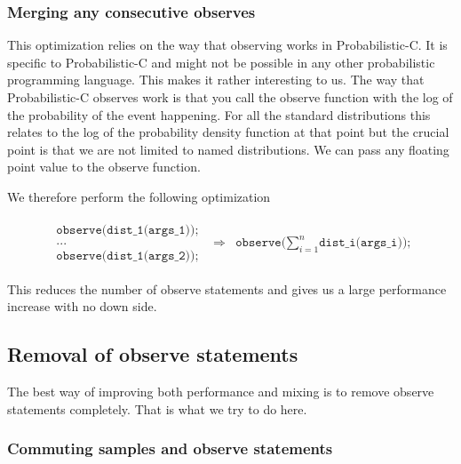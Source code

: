 \documentclass[a4paper]{article}
\newcommand{\optimization}[2]{
	\[
		\begin{array}{rcl}
			#1 & \Rightarrow & #2
		\end{array}
	\]
}
\begin{document}
\subsubsection{Merging any consecutive observes}

This optimization relies on the way that observing works in Probabilistic-C. It is specific to Probabilistic-C and might not be possible in any other probabilistic programming language. This makes it rather interesting to us. The way that Probabilistic-C observes work is that you call the observe function with the log of the probability of the event happening. For all the standard distributions this relates to the log of the probability density function at that point but the crucial point is that we are not limited to named distributions. We can pass any floating point value to the observe function.

We therefore perform the following optimization
\optimization{
	\begin{array}{l}
		\texttt{observe(dist\_1(args\_1));} \\
		\texttt{...} \\
		\texttt{observe(dist\_1(args\_2));}
	\end{array}
}{
	\texttt{observe(}\sum_{i=1}^n\texttt{dist\_i(args\_i));}
}

This reduces the number of observe statements and gives us a large performance increase with no down side.




\subsection{Removal of observe statements}

The best way of improving both performance and mixing is to remove observe statements completely. That is what we try to do here.




\subsubsection{Commuting samples and observe statements}
\end{document}
